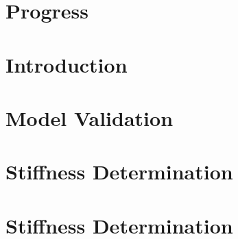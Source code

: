 \documentclass[12pt,twoside]{report}
\begin{document}

\thispagestyle{empty}



%

\tableofcontents

%






\chapter{Progress}


\chapter{Introduction}


\chapter{Model Validation}


\chapter{Stiffness Determination}




%




\newpage


\cleardoublepage

\appendix
\chapter{Stiffness Determination}

\end{document}

